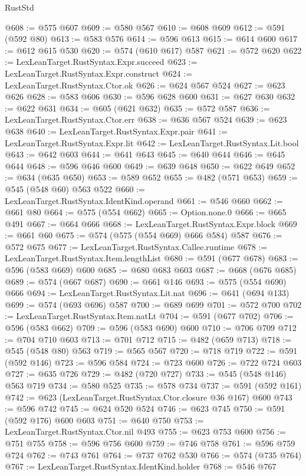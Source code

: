 \begin{lexlean}{RustStd}
\begin{coremodule}
{\begin{coremodule}
{{{{{{{{{{{{{{{{@608 := @575 @607
@609 := @580 @567
@610 := @608 @609
@612 := @591 (@592 @80)
@613 := @583 @576
@614 := @596 @613
@615 := @614 @600
@617 := @612 @615 @530
@620 := @574 (@610 @617) @587
@621 := @572 @620
@622 := LexLeanTarget.RustSyntax.Expr.succeed
@623 := LexLeanTarget.RustSyntax.Expr.construct
@624 := LexLeanTarget.RustSyntax.Ctor.ok
@626 := @624 @567 @524
@627 := @623 @626
@628 := @583 @606
@630 := @596 @628 @600
@631 := @627 @630
@632 := @622 @631
@634 := @605 (@621 @632)
@635 := @572 @587
@636 := LexLeanTarget.RustSyntax.Ctor.err
@638 := @636 @567 @524
@639 := @623 @638
@640 := LexLeanTarget.RustSyntax.Expr.pair
@641 := LexLeanTarget.RustSyntax.Expr.lit
@642 := LexLeanTarget.RustSyntax.Lit.bool
@643 := @642 @603
@644 := @641 @643
@645 := @640 @644
@646 := @645 @644
@648 := @596 @646 @600
@649 := @639 @648
@650 := @622 @649
@652 := @634 (@635 @650)
@653 := @589 @652
@655 := @482 (@571 @653)
@659 := @545 (@548 @60) @563 @522
@660 := LexLeanTarget.RustSyntax.IdentKind.operand
@661 := @546 @660
@662 := @661 @80
@664 := @575 (@554 @662)
@665 := Option.none.{0}
@666 := @665 @491
@667 := @664 @666
@668 := LexLeanTarget.RustSyntax.Expr.block
@669 := @661 @60
@675 := @574 (@575 (@554 @669) @666 @584) @587
@676 := @572 @675
@677 := LexLeanTarget.RustSyntax.Callee.runtime
@678 := LexLeanTarget.RustSyntax.Item.lengthList
@680 := @591 (@677 @678)
@683 := @596 (@583 @669) @600
@685 := @680 @683 @603
@687 := @668 (@676 @685)
@689 := @574 (@667 @687)
@690 := @661 @146
@693 := @575 (@554 @690) @666
@694 := LexLeanTarget.RustSyntax.Lit.nat
@696 := @641 (@694 @133)
@699 := @574 (@693 @696) @587
@700 := @689 @699
@701 := @572 @700
@702 := LexLeanTarget.RustSyntax.Item.natLt
@704 := @591 (@677 @702)
@706 := @596 (@583 @662)
@709 := @596 (@583 @690) @600
@710 := @706 @709
@712 := @704 @710 @603
@713 := @701 @712
@715 := @482 (@659 @713)
@718 := @545 (@548 @80) @563
@719 := @565 @567
@720 := @718 @719
@722 := @591 (@592 @146)
@723 := @596 @584
@724 := @723 @600
@726 := @722 @724 @603
@727 := @635 @726
@729 := @482 (@720 @727)
@733 := @545 (@548 @146) @563 @719
@734 := @580 @525
@735 := @578 @734
@737 := @591 (@592 @161)
@742 := @623 (LexLeanTarget.RustSyntax.Ctor.closure @36 @167) @600
@743 := @596 @742
@745 := @624 @520 @524
@746 := @623 @745
@750 := @591 (@592 @176) @600 @603
@751 := @640 @750
@753 := LexLeanTarget.RustSyntax.Ctor.nil @493
@755 := @623 @753 @600
@756 := @751 @755
@758 := @596 @756 @600
@759 := @746 @758
@761 := @596 @759 @724
@762 := @743 @761
@764 := @737 @762 @530
@766 := @574 (@735 @764)
@767 := LexLeanTarget.RustSyntax.IdentKind.holder
@768 := @546 @767
}}}}}}}}}}}}}}}}
\end{coremodule}}
\end{coremodule}
\end{lexlean}
